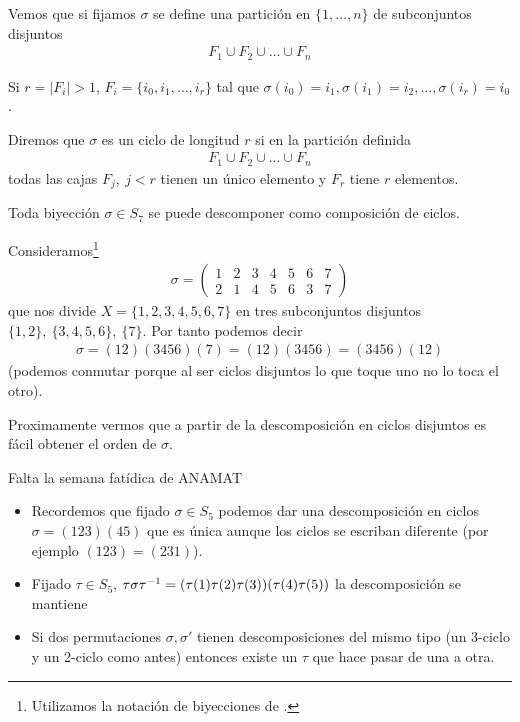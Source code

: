 Vemos que si fijamos $\sigma$ se define una partición en $\{1, \dots, n\}$ de subconjuntos disjuntos
\begin{align*}
F_1 \cup F_2 \cup \dots \cup F_n
\end{align*}

Si $r = |F_i| > 1$, $F_i = \{i_0, i_1, \dots, i_r\}$ tal que $\sigma(i_0) = i_1, \sigma(i_1) = i_2, \dots, \sigma(i_r) = i_0$.

\begin{dfn}[Ciclo]
	\label{dfn:ciclo}
	Diremos que $\sigma$ es un ciclo de longitud $r$ si en la partición definida
	\begin{align*}
	F_1 \cup F_2 \cup \dots \cup F_n
	\end{align*}
	todas las cajas $F_j,\ j < r$ tienen un único elemento y $F_r$ tiene $r$ elementos.
\end{dfn}

\begin{pro}
	Toda biyección $\sigma \in S_7$ se puede descomponer como composición de ciclos.
\end{pro}

\begin{ej}
	Consideramos\footnote{Utilizamos la notación de biyecciones de \cite{dor96}.}
	\begin{align*}
	\sigma = \left(\begin{array}{ccccccc}
	1 & 2 & 3 & 4 & 5 & 6 & 7 \\
	2 & 1 & 4 & 5 & 6 & 3 & 7
	\end{array}\right)
	\end{align*}
	que nos divide $X = \{1, 2, 3, 4, 5, 6, 7\}$ en tres subconjuntos disjuntos $\{1, 2\},\ \{3, 4, 5, 6\},\ \{7\}$. Por tanto podemos decir
	\begin{align*}
	\sigma = (12)(3456)(7) = (12)(3456) = (3456)(12)
	\end{align*}
	(podemos conmutar porque al ser ciclos disjuntos lo que toque uno no lo toca el otro).
\end{ej}

Proximamente vermos que a partir de la descomposición en ciclos disjuntos es fácil obtener el orden de $\sigma$.

\hr

Falta la semana fatídica de ANAMAT\newline
\hr

\begin{itemize}
	\item Recordemos que fijado $\sigma \in S_5$ podemos dar una descomposición en ciclos $\sigma = (123)(45)$ que es única aunque los ciclos se escriban diferente (por ejemplo $(123) = (231)$).
	
	\item Fijado $\tau \in S_5$, $\tau \sigma \tau^{-1} = (\tau(1)\tau(2)\tau(3))(\tau(4)\tau(5))$ la descomposición se mantiene
	
	\item Si dos permutaciones $\sigma, \sigma'$ tienen descomposiciones del mismo tipo (un 3-ciclo y un 2-ciclo como antes) entonces existe un $\tau$ que hace pasar de una a otra.
\end{itemize}

